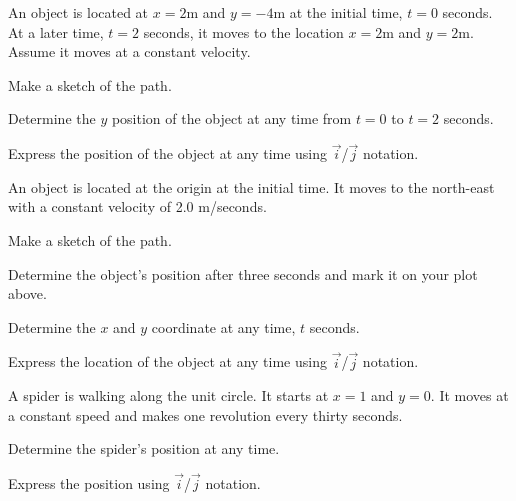\begin{problem}
\item An object is located at $x=2$m and $y=-4$m at the initial time,
  $t=0$ seconds. At a later time, $t=2$ seconds, it moves to the
  location $x=2$m and $y=2$m. Assume it moves at a constant velocity.
  \vfill
  \begin{subproblem}
  \item Make a sketch of the path.
    \vfill
  \item Determine the $y$ position of the object at any time from
    $t=0$ to $t=2$ seconds.
    \vfill
  \item Express the position of the object at any time using
    $\vec{i}$/$\vec{j}$ notation.
    \vspace{3em}
  \end{subproblem}

  \clearpage

\item An object is located at the origin at the initial time. It moves
  to the north-east with a constant velocity of 2.0 m/seconds. 

  \begin{subproblem}
  \item Make a sketch of the path.
    \vfill
  \item Determine the object's position after three seconds and mark
    it on your plot above.
    \vspace{4em}
  \item Determine the $x$ and $y$ coordinate at any time, $t$ seconds.
    \vfill
  \item Express the location of the object at any time using
    $\vec{i}$/$\vec{j}$ notation.
    \vspace{3em}
  \end{subproblem}

  \clearpage

\item A spider is walking along the unit circle. It starts at $x=1$
  and $y=0$. It moves at a constant speed and makes one revolution
  every thirty seconds.

  \scalebox{0.35}{}

  \begin{subproblem}
  \item Determine the spider's position at any time.
    \vfill
  \item Express the position using $\vec{i}$/$\vec{j}$ notation.
    \vspace{5em}
  \end{subproblem}

\end{problem}

